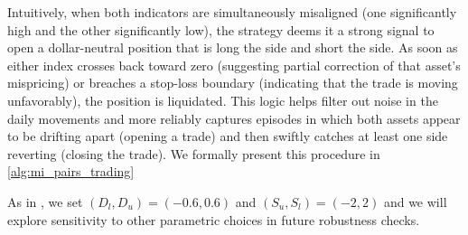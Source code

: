 Intuitively, when both indicators are simultaneously misaligned (one significantly high and the other significantly low), the strategy deems it a strong signal to open a dollar-neutral position that is long the  side and short the  side. As soon as either index crosses back toward zero (suggesting partial correction of that asset's mispricing) or breaches a stop-loss boundary (indicating that the trade is moving unfavorably), the position is liquidated. This  logic helps filter out noise in the daily movements and more reliably captures episodes in which both assets appear to be drifting apart (opening a trade) and then swiftly catches at least one side reverting (closing the trade). 
%
We formally present this procedure in \cref{alg:mi_pairs_trading}

As in \cite{Xie2016}, we set $(D_l, D_u)=(-0.6,0.6)$ and $(S_u,S_l)=(-2,2)$ and we will explore sensitivity to other parametric choices in future robustness checks.







